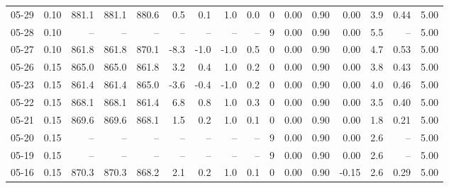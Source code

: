 \begin{threeparttable}
{\begin{tabular}{lrrrrrrrrrrrrrrr}
  05-29 &     0.10 & 881.1 & 881.1 & 880.6 &        0.5 &            0.1 &                      1.0 &                 0.0 &              0 &       0.00 &      0.90 &           0.00 &              3.9 &            0.44 &                   5.00 \\
  05-28 &     0.10 &    -- &    -- &    -- &         -- &             -- &                       -- &                  -- &              9 &       0.00 &      0.90 &           0.00 &              5.5 &              -- &                   5.00 \\
  05-27 &     0.10 & 861.8 & 861.8 & 870.1 &       -8.3 &           -1.0 &                     -1.0 &                 0.5 &              0 &       0.00 &      0.90 &           0.00 &              4.7 &            0.53 &                   5.00 \\
  05-26 &     0.15 & 865.0 & 865.0 & 861.8 &        3.2 &            0.4 &                      1.0 &                 0.2 &              0 &       0.00 &      0.90 &           0.00 &              3.8 &            0.43 &                   5.00 \\
  05-23 &     0.15 & 861.4 & 861.4 & 865.0 &       -3.6 &           -0.4 &                     -1.0 &                 0.2 &              0 &       0.00 &      0.90 &           0.00 &              4.0 &            0.46 &                   5.00 \\
  05-22 &     0.15 & 868.1 & 868.1 & 861.4 &        6.8 &            0.8 &                      1.0 &                 0.3 &              0 &       0.00 &      0.90 &           0.00 &              3.5 &            0.40 &                   5.00 \\
  05-21 &     0.15 & 869.6 & 869.6 & 868.1 &        1.5 &            0.2 &                      1.0 &                 0.1 &              0 &       0.00 &      0.90 &           0.00 &              1.8 &            0.21 &                   5.00 \\
  05-20 &     0.15 &    -- &    -- &    -- &         -- &             -- &                       -- &                  -- &              9 &       0.00 &      0.90 &           0.00 &              2.6 &              -- &                   5.00 \\
  05-19 &     0.15 &    -- &    -- &    -- &         -- &             -- &                       -- &                  -- &              9 &       0.00 &      0.90 &           0.00 &              2.6 &              -- &                   5.00 \\
  05-16 &     0.15 & 870.3 & 870.3 & 868.2 &        2.1 &            0.2 &                      1.0 &                 0.1 &              0 &       0.00 &      0.90 &          -0.15 &              2.6 &            0.29 &                   5.00 \\

\end{tabular}}
\end{threeparttable}
